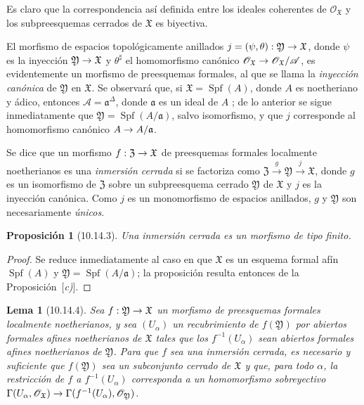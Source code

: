 \documentclass[oneside]{amsart}
\theoremstyle{ega-env-style}
\theoremstyle{ega-thm-env-style}
\newtheorem*{proposition}{Proposición}
\newtheorem*{lemma}{Lema}
\theoremstyle{ega-defn-env-style}
\renewcommand{\to}{\mathchoice{\longrightarrow}{\rightarrow}{\rightarrow}{\rightarrow}}
\let\EGAOriginalLabel\label
\renewcommand{\label}[1]{\phantomsection\EGAOriginalLabel{#1}}
\newcommand{\erratum}[2][]{{#2}\marginpar{\footnotesize\textbf{Err}\textsubscript{#1}}}
\begin{document}
Es claro que la correspondencia así definida entre los \erratum[II]{ideales coherentes de $\mathscr{O}_{\mathfrak{X}}$} y los subpreesquemas cerrados de $\mathfrak{X}$ es biyectiva.

El morfismo de espacios topológicamente anillados $j=(\psi,\theta):\mathfrak{Y}\to\mathfrak{X}$, donde $\psi$ es la inyección $\mathfrak{Y}\to\mathfrak{X}$ y $\theta^\sharp$ el homomorfismo canónico $\mathscr{O}_{\mathfrak{X}}\to\mathscr{O}_{\mathfrak{X}}/\mathscr{A}$, es evidentemente  un morfismo de preesquemas formales, al que se llama la \emph{inyección canónica} de $\mathfrak{Y}$ en $\mathfrak{X}$.
Se observará que, si $\mathfrak{X}=\operatorname{Spf}(A)$, donde $A$ es noetheriano y ádico, entonces $\mathscr{A}=\mathfrak{a}^\Delta$, donde $\mathfrak{a}$ es un ideal de $A$ ; de lo anterior se sigue inmediatamente que $\mathfrak{Y}=\operatorname{Spf}(A/\mathfrak{a})$, salvo isomorfismo, y que $j$ corresponde  al homomorfismo canónico $A\to A/\mathfrak{a}$.

Se dice que un morfismo $f:\mathfrak{Z}\to\mathfrak{X}$ de preesquemas formales localmente noetherianos es una \emph{inmersión cerrada} si se factoriza como $\mathfrak{Z}\xrightarrow{g}\mathfrak{Y}\xrightarrow{j}\mathfrak{X}$, donde $g$ es un isomorfismo de $\mathfrak{Z}$ sobre un subpreesquema cerrado $\mathfrak{Y}$ de $\mathfrak{X}$ y $j$ es la inyección canónica.
Como $j$ es un monomorfismo de espacios anillados, $g$ y $\mathfrak{Y}$ son necesariamente \emph{únicos}.

\begin{proposition}[10.14.3]
\label{I.10.14.3}
Una inmersión cerrada es un morfismo de tipo finito.
\end{proposition}

\begin{proof}
Se reduce inmediatamente al caso en que $\mathfrak{X}$ es un esquema formal afín $\operatorname{Spf}(A)$ y $\mathfrak{Y}=\operatorname{Spf}(A/\mathfrak{a})$;
la proposición resulta entonces de la Proposición~[\emph{c)}].
\end{proof}

\begin{lemma}[10.14.4]
\label{I.10.14.4}
Sea $f:\mathfrak{Y}\to\mathfrak{X}$ un morfismo de preesquemas formales localmente noetherianos, y sea $(U_\alpha)$ un recubrimiento de $f(\mathfrak{Y})$ por abiertos formales afines noetherianos de $\mathfrak{X}$ tales que los $f^{-1}(U_\alpha)$ sean abiertos formales afines noetherianos de $\mathfrak{Y}$.
Para que $f$ sea una inmersión cerrada, es necesario y suficiente que $f(\mathfrak{Y})$ sea un subconjunto cerrado de $\mathfrak{X}$ y que, para todo $\alpha$, la restricción de $f$ a $f^{-1}(U_\alpha)$ corresponda  a un homomorfismo sobreyectivo $\Gamma(U_\alpha,\mathscr{O}_{\mathfrak{X}})\to
\Gamma(f^{-1}(U_\alpha),\mathscr{O}_{\mathfrak{Y}})$.
\end{lemma}
\end{document}
